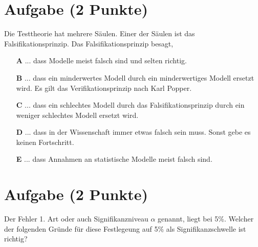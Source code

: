 \documentclass[a4paper, 9pt]{scrartcl}\usepackage[]{graphicx}\usepackage[]{xcolor}
\begin{document}
\section{Aufgabe \hfill (2 Punkte)}



Die Testtheorie hat mehrere Säulen. Einer der Säulen ist das Falsifikationsprinzip. Das Falsifikationsprinzip besagt,



\begin{enumerate}
\item [\textbf{A} \msquare] ... dass Modelle meist falsch sind und selten richtig.
\item [\textbf{B} \msquare] ... dass ein minderwertes Modell durch ein minderwertiges Modell ersetzt wird. Es gilt das Verifikationsprinzip nach Karl Popper.
\item [\textbf{C} \msquare] ... dass ein schlechtes Modell durch das Falsifikationsprinzip durch ein weniger schlechtes Modell ersetzt wird.
\item [\textbf{D} \msquare] ... dass in der Wissenschaft immer etwas falsch sein muss. Sonst gebe es keinen Fortschritt.
\item [\textbf{E} \msquare] ... dass Annahmen an statistische Modelle meist falsch sind.
\end{enumerate}

\section{Aufgabe \hfill (2 Punkte)}



Der Fehler 1. Art oder auch Signifikanzniveau $\alpha$ genannt, liegt bei
5\%. Welcher der folgenden Gründe für diese Festlegeung auf 5\% als Signifikanzschwelle ist richtig?
\end{document}
